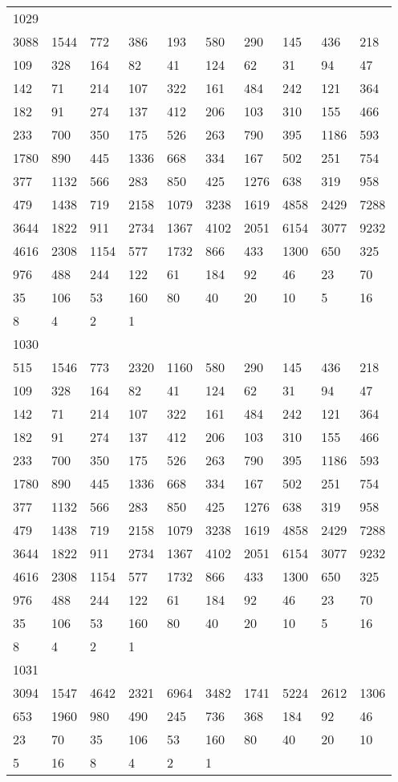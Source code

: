 \begin{longtable}{*{10}{l}}
1029&&&&&&&&&\\
3088& 1544& 772& 386& 193& 580& 290& 145& 436& 218\\
109& 328& 164& 82& 41& 124& 62& 31& 94& 47\\
142& 71& 214& 107& 322& 161& 484& 242& 121& 364\\
182& 91& 274& 137& 412& 206& 103& 310& 155& 466\\
233& 700& 350& 175& 526& 263& 790& 395& 1186& 593\\
1780& 890& 445& 1336& 668& 334& 167& 502& 251& 754\\
377& 1132& 566& 283& 850& 425& 1276& 638& 319& 958\\
479& 1438& 719& 2158& 1079& 3238& 1619& 4858& 2429& 7288\\
3644& 1822& 911& 2734& 1367& 4102& 2051& 6154& 3077& 9232\\
4616& 2308& 1154& 577& 1732& 866& 433& 1300& 650& 325\\
976& 488& 244& 122& 61& 184& 92& 46& 23& 70\\
35& 106& 53& 160& 80& 40& 20& 10& 5& 16\\
8& 4& 2& 1& \\

1030&&&&&&&&&\\
515& 1546& 773& 2320& 1160& 580& 290& 145& 436& 218\\
109& 328& 164& 82& 41& 124& 62& 31& 94& 47\\
142& 71& 214& 107& 322& 161& 484& 242& 121& 364\\
182& 91& 274& 137& 412& 206& 103& 310& 155& 466\\
233& 700& 350& 175& 526& 263& 790& 395& 1186& 593\\
1780& 890& 445& 1336& 668& 334& 167& 502& 251& 754\\
377& 1132& 566& 283& 850& 425& 1276& 638& 319& 958\\
479& 1438& 719& 2158& 1079& 3238& 1619& 4858& 2429& 7288\\
3644& 1822& 911& 2734& 1367& 4102& 2051& 6154& 3077& 9232\\
4616& 2308& 1154& 577& 1732& 866& 433& 1300& 650& 325\\
976& 488& 244& 122& 61& 184& 92& 46& 23& 70\\
35& 106& 53& 160& 80& 40& 20& 10& 5& 16\\
8& 4& 2& 1& \\

1031&&&&&&&&&\\
3094& 1547& 4642& 2321& 6964& 3482& 1741& 5224& 2612& 1306\\
653& 1960& 980& 490& 245& 736& 368& 184& 92& 46\\
23& 70& 35& 106& 53& 160& 80& 40& 20& 10\\
5& 16& 8& 4& 2& 1& \\


\end{longtable}
